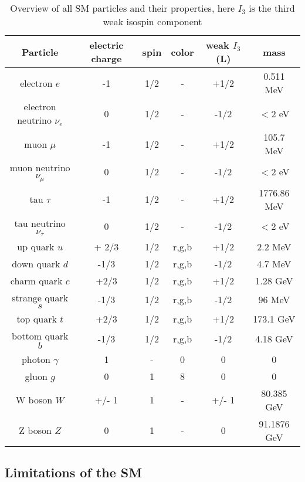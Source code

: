 \begin{table}[h]
	\centering
	\begin{tabular}{|c|c|c|c|c|c|}\hline
Particle & electric charge & spin & color & weak $I_3$ (L)  & mass \\ \hline \hline
electron $e$ & -1 & 1/2 & - & +1/2 &  0.511 MeV \\
electron neutrino $\nu_e$ & 0 & 1/2 & - & -1/2 & $< 2$ eV\\
muon $\mu$ & -1 & 1/2 & -& +1/2 & 105.7 MeV \\
muon neutrino $\nu_\mu$ & 0 & 1/2 & - & -1/2 & $< 2$ eV\\
tau $\tau$ & -1 & 1/2 & - & +1/2 &  1776.86 MeV\\
tau neutrino $\nu_\tau$ & 0 & 1/2 & - & -1/2 &  $< 2$ eV\\ \hline
up quark $u$ & + 2/3 & 1/2 & r,g,b & +1/2 &  2.2 MeV\\
down quark $d$ & -1/3 & 1/2 & r,g,b & -1/2 &  4.7 MeV\\
charm quark $c$ & +2/3 & 1/2 & r,g,b & +1/2 &  1.28 GeV \\
strange quark $s$ & -1/3 & 1/2 & r,g,b & -1/2 & 96 MeV\\
top quark $t$ & +2/3 & 1/2 & r,g,b & +1/2 &  173.1 GeV\\
bottom quark $b$ & -1/3 & 1/2 &r,g,b & -1/2 & 4.18 GeV\\ \hline
photon $\gamma$ & 1 & - & 0 & 0  &0 \\
gluon $g$ & 0 & 1 & 8  & 0 &  0\\
W boson $W$ & +/- 1 & 1 & - & +/- 1&  80.385 GeV\\
Z boson $Z$ & 0 & 1 & - & 0 &   91.1876 GeV\\ \hline
	\end{tabular}
	\caption{Overview of all SM particles and their properties, here $I_3$ is the third weak isospin component \label{tab:theory:particlesSM}\cite{PDG}}
\end{table}

\subsection{Limitations of the SM}

